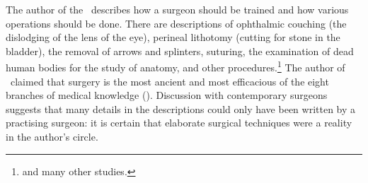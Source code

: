 
The author of the \SS\ describes how a surgeon should be trained 
and how
various operations should be done.  There are descriptions of ophthalmic couching
(the dislodging of the lens of the eye), perineal lithotomy (cutting for stone in
the bladder), the removal of arrows and splinters, suturing, the examination of
dead human bodies for the study of anatomy, and other
procedures.\footnote{\cites{mukh-1913,desh-2000,nara-2011,wuja-2003,wils-1823}
 and
many other studies.} The author of \SS\ claimed that 
surgery is
the most ancient and most efficacious of the eight branches of medical knowledge
(). Discussion with contemporary surgeons suggests 
that
many details in the descriptions could only have been written by a practising
surgeon: it is certain that elaborate surgical techniques were a reality in
the author's circle.


%

